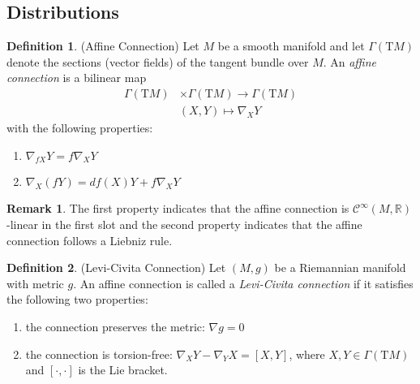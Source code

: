 \documentclass[12pt]{article}
\theoremstyle{definition}
\newtheorem{definition}{Definition}[section]
\newtheorem{remark}{Remark}[subsection]
\numberwithin{equation}{subsection}
\begin{document}
\subsection{Distributions}
\begin{definition}
(Affine Connection) Let $M$ be a smooth manifold and let $\Gamma(\text{T}M)$ denote the sections (vector fields) of the tangent bundle over $M$. An \textit{affine connection} is a bilinear map
\begin{align*}
\Gamma(\text{T}M) &\times \Gamma(\text{T}M) \rightarrow \Gamma(\text{T}M) \\
&(X , Y) \mapsto \nabla_X Y
\end{align*}
with the following properties:
\begin{enumerate}
    \item $\nabla_{fX}Y = f \nabla_X Y$
    \item $\nabla_X (fY) = df (X) Y + f \nabla_X Y$
\end{enumerate}
\end{definition}
\begin{remark}
The first property indicates that the affine connection is $\mathcal{C}^\infty(M , \mathbb{R})$-linear in the first slot and the second property indicates that the affine connection follows a Liebniz rule.
\end{remark}
\begin{definition}
(Levi-Civita Connection) Let $(M, g)$ be a Riemannian manifold with metric $g$. An affine connection is called a \textit{Levi-Civita connection} if it satisfies the following two properties:
\begin{enumerate}
    \item the connection preserves the metric: $\nabla g = 0$
    \item the connection is torsion-free: $\nabla_X Y - \nabla_Y X = [ X, Y]$, where $X, Y \in \Gamma(\text{T}M)$ and $[ \cdot, \cdot ]$ is the Lie bracket.
\end{enumerate}
\end{definition}
\end{document}
